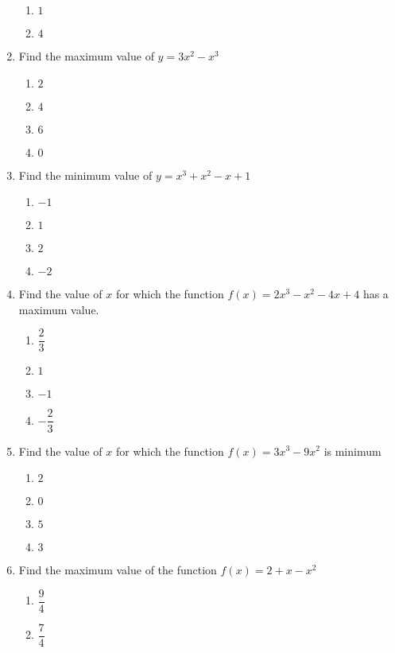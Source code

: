 \begin{multicols}{2}
\begin{enumerate}[label={\arabic*.}]
\begin{enumerate}[label={\Alph*.}]
			\item \(1\)
			\item \(4\)
        \end{enumerate}
  \item Find the maximum value of \(y = 3{x}^{2} - {x}^{3}\)
        \begin{enumerate}[label={\Alph*.}]
            \item \(2\)
            \item \(4\)
            \item \(6\)
            \item \(0\)
        \end{enumerate}
  \item Find the minimum value of \(y = {x}^{3} + {x}^{2} - x + 1\)
        \begin{enumerate}[label={\Alph*.}]
            \item \(-1\)
			\item \(1\)
			\item \(2\)
			\item \(-2\)
        \end{enumerate}
  \item Find the value of \(x\) for which the function \(f(x) = 2{x}^{3} - {x}^{2} -4x + 4\) has a maximum value.
        \begin{enumerate}[label={\Alph*.}]
            \item \(\dfrac{2}{3}\)
            \item \(1\)
            \item \(-1\)
            \item \(-\dfrac{2}{3}\)
        \end{enumerate}
  \item Find the value of \(x\) for which the function \(f(x) = 3{x}^{3}-9{x}^{2}\) is minimum
        \begin{enumerate}[label={\Alph*.}]
            \item \(2\)
            \item \(0\)
            \item \(5\)
            \item \(3\)
        \end{enumerate}
  \item Find the maximum value of the function \(f(x) = 2 + x - {x}^{2}\)
        \begin{enumerate}[label={\Alph*.}]
            \item \(\dfrac{9}{4}\)
            \item \(\dfrac{7}{4}\)

\end{enumerate}
\end{enumerate}
\end{multicols}
